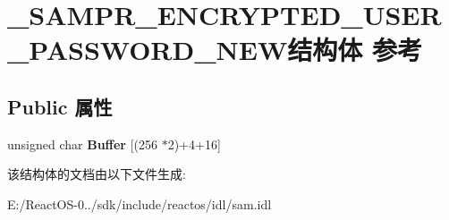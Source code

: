 \hypertarget{struct___s_a_m_p_r___e_n_c_r_y_p_t_e_d___u_s_e_r___p_a_s_s_w_o_r_d___n_e_w}{}\section{\+\_\+\+S\+A\+M\+P\+R\+\_\+\+E\+N\+C\+R\+Y\+P\+T\+E\+D\+\_\+\+U\+S\+E\+R\+\_\+\+P\+A\+S\+S\+W\+O\+R\+D\+\_\+\+N\+E\+W结构体 参考}
\label{struct___s_a_m_p_r___e_n_c_r_y_p_t_e_d___u_s_e_r___p_a_s_s_w_o_r_d___n_e_w}
\subsection*{Public 属性}
\begin{DoxyCompactItemize}
\item 
\mbox{\label{struct___s_a_m_p_r___e_n_c_r_y_p_t_e_d___u_s_e_r___p_a_s_s_w_o_r_d___n_e_w_ac73d9d6945c2e05d24b77bfb24623364}} 
unsigned char {\bfseries Buffer} \mbox{[}(256 $\ast$2)+4+16\mbox{]}
\end{DoxyCompactItemize}


该结构体的文档由以下文件生成\+:\begin{DoxyCompactItemize}
\item 
E\+:/\+React\+O\+S-\/0../sdk/include/reactos/idl/sam.\+idl\end{DoxyCompactItemize}
